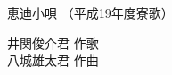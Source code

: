 \documentclass[10pt,b5j]{tarticle} %
\begin{document}
\begin{minipage}[c]{0.7\hsize} %
    \begin{center}
        {\LARGE
            恵迪小唄 %
        }
        {\small 
            （平成19年度寮歌） %
        }
    \end{center}
\end{minipage}
\begin{minipage}[c]{0.3\hsize} %
    \begin{flushright} %
        井関俊介君 作歌\\八城雄太君 作曲 %
    \end{flushright}
\end{minipage}
\end{document}
